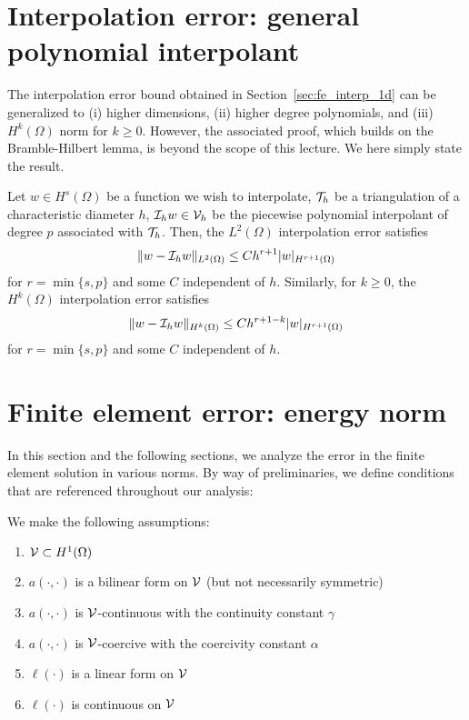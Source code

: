\section{Interpolation error: general polynomial interpolant}
The interpolation error bound obtained in Section~\ref{sec:fe_interp_1d} can be generalized to (i) higher dimensions, (ii) higher degree polynomials, and (iii) $H^k(\Omega)$ norm for $k \geq 0$.  However, the associated proof, which builds on the Bramble-Hilbert lemma, is beyond the scope of this lecture.  We here simply state the result.
\begin{proposition}
Let $w \in H^s(\Omega)$ be a function we wish to interpolate, $\mathcal{T}_h$ be a triangulation of a characteristic diameter $h$, $\mathcal{I}_h w \in \mathcal{V}_h$ be the piecewise polynomial interpolant of degree $p$ associated with $\mathcal{T}_h$. Then, the $L^2(\Omega)$ interpolation error satisfies
\begin{align*}
  \| w - \mathcal{I}_h w \|_{L^2(\Omega)} \leq C h^{r+1} | w |_{H^{r+1}(\Omega)}
\end{align*}
for $r = \min\{ s,p \}$ and some $C$ independent of $h$. Similarly, for $k \geq 0$, the $H^k(\Omega)$ interpolation error satisfies 
\begin{align*}
  \| w - \mathcal{I}_h w \|_{H^k(\Omega)} \leq C h^{r+1-k} | w |_{H^{r+1}(\Omega)}
\end{align*}
for $r = \min\{ s,p \}$ and some $C$ independent of $h$.
\end{proposition}


\section{Finite element error: energy norm}
In this section and the following sections, we analyze the error in the finite element solution in various norms. By way of preliminaries, we define conditions that are referenced throughout our analysis:
\begin{assumption}
  We make the following assumptions:
\begin{enumerate}
  \item $\mathcal{V} \subset H^1(\Omega)$
  \item $a(\cdot,\cdot)$ is a bilinear form on $\mathcal{V}$ (but not necessarily symmetric)
  \item $a(\cdot,\cdot)$ is $\mathcal{V}$-continuous with the continuity constant $\gamma$
  \item $a(\cdot,\cdot)$ is $\mathcal{V}$-coercive with the coercivity constant $\alpha$
  \item $\ell(\cdot)$ is a linear form on $\mathcal{V}$
  \item $\ell(\cdot)$ is continuous on $\mathcal{V}$
\end{enumerate}
\end{assumption}


